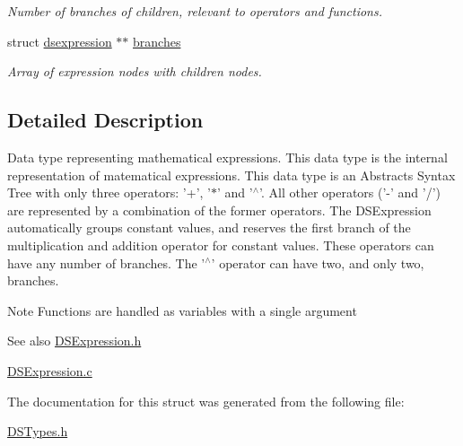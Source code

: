 \begin{DoxyCompactItemize}
\begin{DoxyCompactList}\small\item\em Number of branches of children, relevant to operators and functions. \item\end{DoxyCompactList}\item 
\hypertarget{structdsexpression_a35237107e14601d760b6bcd9cc0af0e2}{
struct \hyperlink{structdsexpression}{dsexpression} $\ast$$\ast$ \hyperlink{structdsexpression_a35237107e14601d760b6bcd9cc0af0e2}{branches}}
\label{structdsexpression_a35237107e14601d760b6bcd9cc0af0e2}

\begin{DoxyCompactList}\small\item\em Array of expression nodes with children nodes. \item\end{DoxyCompactList}\end{DoxyCompactItemize}


\subsection{Detailed Description}
Data type representing mathematical expressions. This data type is the internal representation of matematical expressions. This data type is an Abstracts Syntax Tree with only three operators: '+', '$\ast$' and '$^\wedge$'. All other operators ('-\/' and '/') are represented by a combination of the former operators. The DSExpression automatically groups constant values, and reserves the first branch of the multiplication and addition operator for constant values. These operators can have any number of branches. The '$^\wedge$' operator can have two, and only two, branches.

\begin{DoxyNote}{Note}
Functions are handled as variables with a single argument
\end{DoxyNote}
\begin{DoxySeeAlso}{See also}
\hyperlink{_d_s_expression_8h}{DSExpression.h} 

\hyperlink{_d_s_expression_8c}{DSExpression.c} 
\end{DoxySeeAlso}


The documentation for this struct was generated from the following file:\begin{DoxyCompactItemize}
\item 
\hyperlink{_d_s_types_8h}{DSTypes.h}\end{DoxyCompactItemize}
